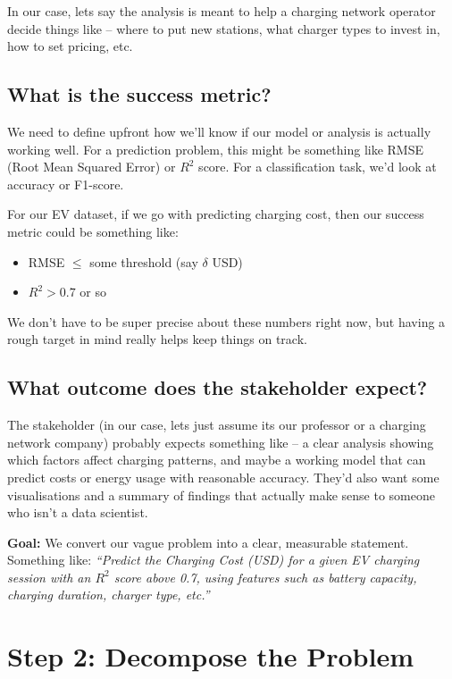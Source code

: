 \documentclass[12pt, a4paper]{article}
\begin{document}
In our case, lets say the analysis is meant to help a charging network operator decide things like -- where to put new stations, what charger types to invest in, how to set pricing, etc.

\subsection{What is the success metric?}

We need to define upfront how we'll know if our model or analysis is actually working well. For a prediction problem, this might be something like RMSE (Root Mean Squared Error) or $R^2$ score. For a classification task, we'd look at accuracy or F1-score.

For our EV dataset, if we go with predicting charging cost, then our success metric could be something like:
\begin{itemize}
    \item RMSE $\leq$ some threshold (say $\delta$ USD)
    \item $R^2 > 0.7$ or so
\end{itemize}

We don't have to be super precise about these numbers right now, but having a rough target in mind really helps keep things on track.

\subsection{What outcome does the stakeholder expect?}

The stakeholder (in our case, lets just assume its our professor or a charging network company) probably expects something like -- a clear analysis showing which factors affect charging patterns, and maybe a working model that can predict costs or energy usage with reasonable accuracy. They'd also want some visualisations and a summary of findings that actually make sense to someone who isn't a data scientist.

\textbf{Goal:} We convert our vague problem into a clear, measurable statement. Something like: \textit{``Predict the Charging Cost (USD) for a given EV charging session with an $R^2$ score above 0.7, using features such as battery capacity, charging duration, charger type, etc.''}

\newpage

\section{Step 2: Decompose the Problem}
\end{document}
